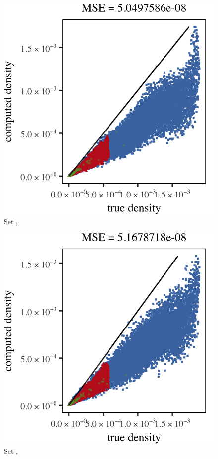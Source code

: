 \begin{subfigure}{0.23\textwidth}
	\centering
	\includegraphics[keepaspectratio=true, width=\textwidth, height=0.23\textheight]{result/img/results_ferdosi_2_60000_sambe_silverman}
	\caption{Set \ferdosiTwo, \sambe}
	\label{fig:results:multisphere:sambe:ferdosi2}
\end{subfigure}
\begin{subfigure}{0.23\textwidth}
	\centering
	\includegraphics[keepaspectratio=true, width=\textwidth, height=0.23\textheight]{result/img/results_baakman_2_60000_sambe_silverman}
	\caption{Set \baakmanTwo, \sambe}
	\label{fig:results:multisphere:sambe:baakman2}
\end{subfigure}
